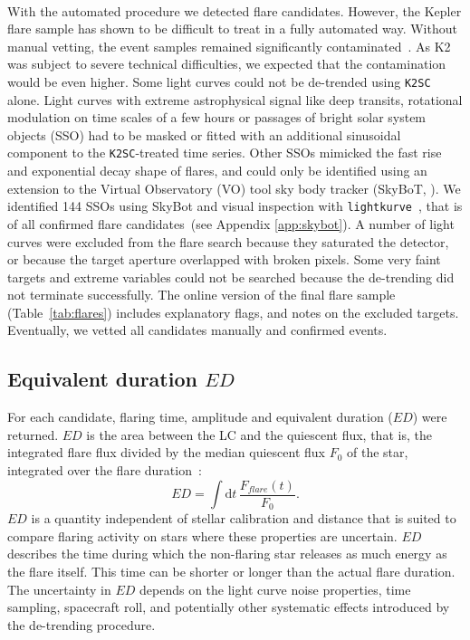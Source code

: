 \documentclass{aa}
\begin{document}
\\
With the automated procedure we detected flare candidates. However, the Kepler flare sample has shown to be difficult to treat in a fully automated way. Without manual vetting, the event samples remained significantly contaminated~\citep{yang2019}. As K2 was subject to severe technical difficulties, we expected that the contamination would be even higher. Some light curves could not be de-trended using \texttt{K2SC} alone. Light curves with extreme astrophysical signal like deep transits, rotational modulation on time scales of a few hours or passages of bright solar system objects (SSO) had to be masked or fitted with an additional sinusoidal component to the \texttt{K2SC}-treated time series. Other SSOs mimicked the fast rise and exponential decay shape of flares, and could only be identified using an extension to the Virtual Observatory (VO) tool sky body tracker (SkyBoT, \citealt{berthier2006, berthier2016}). We identified 144 SSOs using SkyBot and visual inspection with \texttt{lightkurve}~\citep{lightkurve2018}, that is of all confirmed flare candidates~(see Appendix \ref{app:skybot}). A number of light curves were excluded from the flare search because they saturated the detector, or because the target aperture overlapped with broken pixels. Some very faint targets and extreme variables could not be searched because the de-trending did not terminate successfully. The online version of the final flare sample (Table~\ref{tab:flares}) includes explanatory flags, and notes on the excluded targets. Eventually, we vetted all candidates manually and confirmed events.
\subsection{Equivalent duration $ED$}
\label{sec:ed}
For each candidate, flaring time, amplitude and equivalent duration ($ED$) were returned.
$ED$ is the area between the LC and the quiescent flux, that is, the integrated flare flux divided by the median quiescent flux $F_0$ of the star, integrated over the flare duration~\citep{gershberg1972}:
\begin{equation}
\label{eq:ED}
ED=\displaystyle \int \mathrm dt\, \frac{F_{flare}(t)}{F_0}.
\end{equation}
$ED$ is a quantity independent of stellar calibration and distance that is suited to compare flaring activity on stars where these properties are uncertain. $ED$ describes the time during which the non-flaring star releases as much energy as the flare itself. This time can be shorter or longer than the actual flare duration. The uncertainty in $ED$ depends on the light curve noise properties, time sampling, spacecraft roll, and potentially other systematic effects introduced by the de-trending procedure. 
\end{document}
